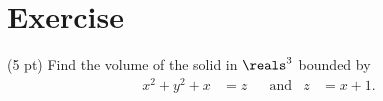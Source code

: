%
%
\section{Exercise}

(5 pt) Find the volume of the solid in $\reals^{3}$ bounded by
\begin{align*}
x^{2} + y^{2} + x
&=
z
&
&\text{and}
&
z
&=
x + 1.
\end{align*}